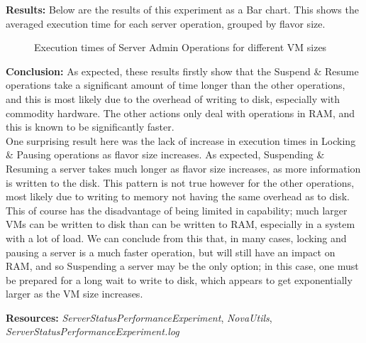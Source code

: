 \textbf{Results:}
Below are the results of this experiment as a Bar chart. This shows the averaged execution time for each server operation, grouped by flavor size. 
\begin{figure}[H]
\centering
{}
\caption{Execution times of Server Admin Operations for different VM sizes}
\end{figure}
\textbf{Conclusion:}
As expected, these results firstly show that the Suspend \& Resume operations take a significant amount of time longer than the other operations, and this is most likely due to the overhead of writing to disk, especially with commodity hardware. The other actions only deal with operations in RAM, and this is known to be significantly faster.  \\
One surprising result here was the lack of increase in execution times in Locking \& Pausing operations as flavor size increases. As expected, Suspending \& Resuming a server takes much longer as flavor size increases, as more information is written to the disk. This pattern is not true however for the other operations, most likely due to writing to memory not having the same overhead as to disk. This of course has the disadvantage of being limited in capability; much larger VMs can be written to disk than can be written to RAM, especially in a system with a lot of load.  
We can conclude from this that, in many cases, locking and pausing a server is a much faster operation, but will still have an impact on RAM, and so Suspending a server may be the only option; in this case, one must be prepared for a long wait to write to disk, which appears to get exponentially larger as the VM size increases. 

\textbf{Resources:}
\textit{ServerStatusPerformanceExperiment}, \textit{NovaUtils}, \textit{ServerStatusPerformanceExperiment.log}